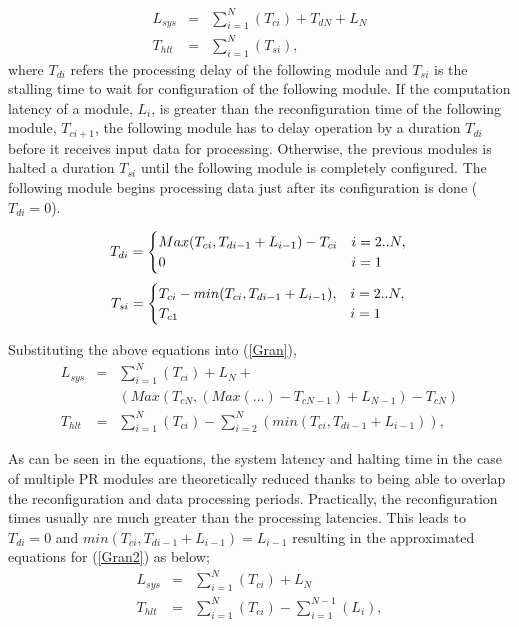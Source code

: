 \begin{eqnarray}
\label{Gran}
L_{sys} &=&  \sum_{i = 1}^{N} (T_{ci}) + T_{dN} + L_{N} \nonumber \\
T_{hlt} &=&  \sum_{i = 1}^{N}  (T_{si}),
\end{eqnarray}
where $T_{di}$ refers the processing delay of the following module and $T_{si}$ is the stalling time to wait for configuration of the following module. If the computation latency of a module, $L_{i}$, is greater than the reconfiguration time of the following module,  $T_{ci+1}$, the following module has to delay operation by a duration $T_{di}$ before it receives input data for processing. Otherwise, the previous modules is halted a duration $T_{si}$ until the following module is completely configured. The following module begins processing data just after its configuration is done ($T_{di} = 0$). 

\begin{equation}
\label{DelayTime}
T_{di} = \begin{cases} Max(T_{ci}, T_{di-1}+L_{i-1}) - T_{ci}  	& i = 2..N, \\ 
						0 										& i = 1 \end{cases}  \\ 
\end{equation}
\begin{equation}
\label{HaltTime}
T_{si} = \begin{cases} T_{ci} - min(T_{ci}, T_{di-1}+L_{i-1}), 	&  i = 2..N, \\ 
					  T_{c1}									&  i=1 \end{cases}  \\ 
\end{equation}

Substituting the above equations into (\ref{Gran}), 
\begin{eqnarray}
\label{Gran2}
L_{sys} &= & \sum_{i = 1}^{N}(T_{ci}) + L_{N} +   \nonumber \\
		& & (Max(T_{cN}, (Max( ... ) - T_{cN-1}) + L_{N-1}) - T_{cN})  \nonumber \\
T_{hlt} &= &\sum_{i = 1}^{N}(T_{ci})  -  \sum_{i = 2}^{N}  (min(T_{ci}, T_{di-1}+L_{i-1})),
\end{eqnarray}

As can be seen in the equations, the system latency and halting time in the case of multiple PR modules are theoretically reduced thanks to being able to overlap the reconfiguration and data processing periods. Practically, the reconfiguration times usually are much greater than the processing latencies. This leads to $T_{di} = 0$ and  $min(T_{ci}, T_{di-1}+L_{i-1}) = L_{i-1}$ resulting in the approximated equations for (\ref{Gran2}) as below;  
\begin{eqnarray}
\label{Gran3}
L_{sys} &= & \sum_{i = 1}^{N}(T_{ci}) + L_{N}    \nonumber \\
T_{hlt} &=  &\sum_{i = 1}^{N}(T_{ci})  -  \sum_{i = 1}^{N-1}  (L_{i}),
\end{eqnarray}

